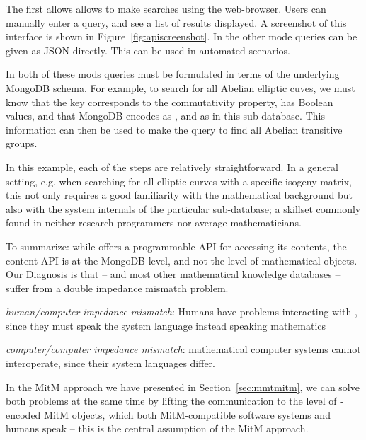 The first allows allows to make searches using the web-browser.  Users can manually enter
a query, and see a list of results displayed.  A screenshot of this interface is shown in
Figure~\ref{fig:apiscreenshot}.  In the other mode queries can be given as JSON
directly.  This can be used in automated scenarios.

In both of these mods queries must be formulated in terms of the underlying MongoDB
schema. For example, to search for all Abelian elliptic cuves, we must know that the
 key
corresponds to the commutativity property, has Boolean values, and that MongoDB encodes
 as , and  as  in this
\lmfdb sub-database. This information can then be used to make the query
 to find all Abelian transitive
groups.

In this example, each of the steps are relatively straightforward. 
In a general setting, e.g. when searching for all elliptic curves with a specific isogeny
matrix, this not only requires a good familiarity with the mathematical background but
also with the system internals of the particular \lmfdb sub-database; a skillset commonly
found in neither research programmers nor average mathematicians.   

To summarize: while \lmfdb offers a programmable API for accessing its contents, the
content API is at the MongoDB level, and not the level of mathematical objects. Our
Diagnosis is that \lmfdb -- and most other mathematical knowledge databases -- suffer from
a double impedance mismatch problem.
\begin{compactenum}[\bf I1]
\item \emph{human/computer impedance mismatch}: Humans have problems interacting with
  \lmfdb, since they must speak the system language instead \lmfdb speaking mathematics
\item \emph{computer/computer impedance mismatch}: mathematical computer systems cannot
  interoperate, since their system languages differ.
\end{compactenum}
In the MitM approach we have presented in Section~\ref{sec:mmtmitm}, we can solve both
problems at the same time by lifting the communication to the level of \ommt-encoded MitM
objects, which both MitM-compatible software systems and humans speak -- this is the
central assumption of the MitM approach.

